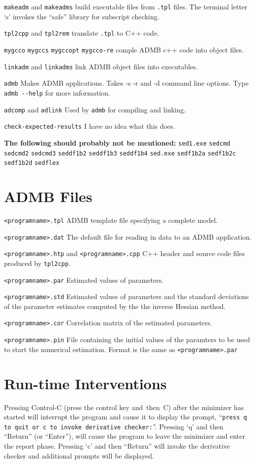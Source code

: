 \documentclass[a4paper,10pt,notumble]{leaflet}
\begin{document}
\verb+makeadm+ and \verb+makeadms+ build executable files from 
\verb+.tpl+ files. The terminal letter `s' invokes the ``safe''
library for subscript checking.

\verb+tpl2cpp+ and \verb+tpl2rem+ translate \verb+.tpl+ to C++ code.

\verb+mygcco+ \verb+mygccs+ \verb+mygccopt+ \verb+mygcco-re+ comple
ADMB c++ code into object files.

\verb+linkadm+ and \verb+linkadms+ link ADMB object files into
executables.

\verb+admb+ Makes ADMB applications. Takes -s -r and -d command line
options. Type \verb+admb --help+ for more information.

\verb+adcomp+ and \verb+adlink+ Used by \verb+admb+ for compiling and
linking.

\verb+check-expected-results+ I have no idea what this does.

{\bf The following should probably not be mentioned:}
\verb+sed1.exe+
\verb+sedcmd+
\verb+sedcmd2+
\verb+sedcmd3+
\verb+seddf1b2+
\verb+seddf1b3+
\verb+seddf1b4+
\verb+sed.exe+
\verb+sedf1b2a+
\verb+sedf1b2c+
\verb+sedf1b2d+
\verb+sedflex+

\section {ADMB Files}

\verb+<programname>.tpl+ ADMB template file specifying a complete
model.

\verb+<programname>.dat+ The default file for reading in data to an
ADMB application.

\verb+<programname>.htp+ and \verb+<programname>.cpp+ C++ header and
source code files produced by \verb+tpl2cpp+.

\verb+<programname>.par+ Estimated values of parameters.

\verb+<programname>.std+ Estimated values of parameters and the
standard deviations of the parameter estimates computed by the the inverse
Hessian method.

\verb+<programname>.cor+ Correlation matrix of the estimated
parameters.

\verb+<programname>.pin+ File containing the initial values of the
paramters to be used to start the numerical estimation. Format is the
same as \verb+<programname>.par+ 

\section{Run-time Interventions}
Pressing Control-C (press the control key and~then~C) after the
minimizer has started will interrupt the program and cause it to
display the prompt, 
``\verb|press q to quit or c to invoke derivative checker:|''.
Pressing `q' and then ``Return'' (or ``Enter''), will cause the
program to leave the minimizer and enter the report phase. Pressing
`c' and then ``Return'' will invoke the derivative checker and
additional prompts will be displayed.
\end{document}
